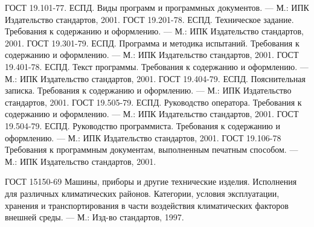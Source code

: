\documentclass{TechDoc}
\begin{document}
    \begin{thebibliography}{9}
         ГОСТ 19.101-77. ЕСПД. Виды программ и программных документов. --- М.: ИПК Издательство стандартов, 2001.
         ГОСТ 19.201-78. ЕСПД. Техническое задание. Требования к содержанию и оформлению. --- М.: ИПК Издательство стандартов, 2001.
         ГОСТ 19.301-79. ЕСПД. Программа и методика испытаний. Требования к содержанию и оформлению. --- М.: ИПК Издательство стандартов, 2001.
         ГОСТ 19.401-78. ЕСПД. Текст программы. Требования к содержанию и оформлению. --- М.: ИПК Издательство стандартов, 2001.
         ГОСТ 19.404-79. ЕСПД. Пояснительная записка. Требования к содержанию и оформлению. --- М.: ИПК Издательство стандартов, 2001.
         ГОСТ 19.505-79. ЕСПД. Руководство оператора. Требования к содержанию и оформлению. --- М.: ИПК Издательство стандартов, 2001.
         ГОСТ 19.504-79. ЕСПД. Руководство программиста. Требования к содержанию и оформлению. --- М.: ИПК Издательство стандартов, 2001.
         ГОСТ 19.106-78 Требования к программным документам, выполненным печатным способом. --- М.: ИПК Издательство стандартов, 2001.
  
         ГОСТ 15150-69 Машины, приборы и другие технические изделия. Исполнения для различных климатических районов. Категории, условия эксплуатации, хранения и транспортирования в части воздействия климатических факторов внешней среды. --- М.: Изд-во стандартов, 1997.
    \end{thebibliography} 

    \registrationList
        
\end{document}
